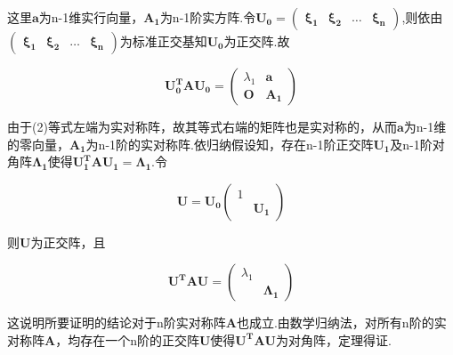 \documentclass{ctexart}
\begin{document}
这里$\boldsymbol{a}$为n-1维实行向量，$\boldsymbol{A_1}$为n-1阶实方阵.令$\boldsymbol{U_0}=\boldsymbol{\left(\begin{array}{cccc}{\xi}_1 & {\xi}_2 & \ldots &{\xi}_n\end{array}\right)}$,则依由$\boldsymbol{\left(\begin{array}{cccc}{\xi}_1 & {\xi}_2 & \ldots &{\xi}_n\end{array}\right)}$为标准正交基知$\boldsymbol{U_0}$为正交阵.故


\begin{equation}
\boldsymbol{U_0^TAU_0}=\left(\begin{array}{cc}{\lambda}_1 & \boldsymbol{a}\\ \boldsymbol{O} & \boldsymbol{A_1}\end{array}\right)
\end{equation}


由于(2)等式左端为实对称阵，故其等式右端的矩阵也是实对称的，从而$\boldsymbol{a}$为n-1维的零向量，$\boldsymbol{A_1}$为n-1阶的实对称阵.依归纳假设知，存在n-1阶正交阵$\boldsymbol{U_1}$及n-1阶对角阵$\boldsymbol{{\Lambda}_1}$使得$\boldsymbol{U^T_1AU_1={\Lambda}_1}$.令


\begin{equation}
\boldsymbol{U}=\boldsymbol{U_0}\left(\begin{array}{cc}1 & \\& \boldsymbol{U_1}\end{array}\right)
\end{equation}


则$\boldsymbol{U}$为正交阵，且


\begin{equation}
\boldsymbol{{U}^TAU}=\left(\begin{array}{cc}{\lambda}_1 & \\& \boldsymbol{{\Lambda}_1}\end{array}\right)
\end{equation}


这说明所要证明的结论对于n阶实对称阵$\boldsymbol{A}$也成立.由数学归纳法，对所有n阶的实对称阵$\boldsymbol{A}$，均存在一个n阶的正交阵$\boldsymbol{U}$使得$\boldsymbol{{U}^TAU}$为对角阵，定理得证.
\end{document}
